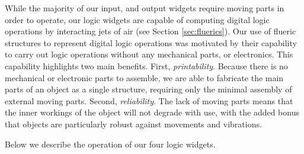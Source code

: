         While the majority of our input, and output widgets require
        moving parts in order to operate, our logic widgets are capable of
        computing digital logic operations by interacting jets of air (see
        Section \ref{sec:fluerics}). Our use of flueric structures to represent
        digital logic operations was motivated by their capability to carry
        out logic operations without any mechanical parts, or electronics.
        This capability highlights two main benefits. First,
        \emph{printability}. Because there is no mechanical or electronic
        parts to assemble, we are able to fabricate the main parts of an \al
        object as a single structure, requiring only the minimal assembly of
        external moving parts. Second, \emph{reliability}. The lack of moving
        parts means that the inner workings of the object will not degrade
        with use, with the added bonus that \al objects are particularly
        robust against movements and vibrations.

        Below we describe the operation of our four logic widgets.

